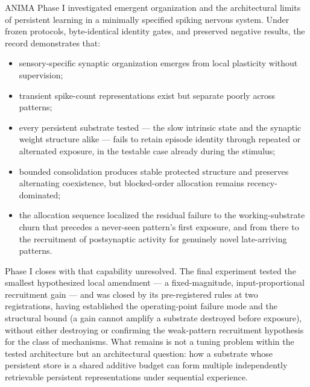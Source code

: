 ANIMA Phase I investigated emergent organization and the architectural
limits of persistent learning in a minimally specified spiking nervous
system. Under frozen protocols, byte-identical identity gates, and
preserved negative results, the record demonstrates that:

\begin{itemize}
\item sensory-specific synaptic organization emerges from local
plasticity without supervision;
\item transient spike-count representations exist but separate poorly
across patterns;
\item every persistent substrate tested --- the slow intrinsic state
and the synaptic weight structure alike --- fails to retain episode
identity through repeated or alternated exposure, in the testable case
already during the stimulus;
\item bounded consolidation produces stable protected structure and
preserves alternating coexistence, but blocked-order allocation
remains recency-dominated;
\item the allocation sequence localized the residual failure to the
working-substrate churn that precedes a never-seen pattern's first
exposure, and from there to the recruitment of postsynaptic activity
for genuinely novel late-arriving patterns.
\end{itemize}

Phase I closes with that capability unresolved. The final experiment
tested the smallest hypothesized local amendment --- a fixed-magnitude,
input-proportional recruitment gain --- and was closed by its
pre-registered rules at two registrations, having established the
operating-point failure mode and the structural bound (a gain cannot
amplify a substrate destroyed before exposure), without either
destroying or confirming the weak-pattern recruitment hypothesis for
the class of mechanisms. What remains is not a tuning problem within
the tested architecture but an architectural question: how a substrate
whose persistent store is a shared additive budget can form multiple
independently retrievable persistent representations under sequential
experience.